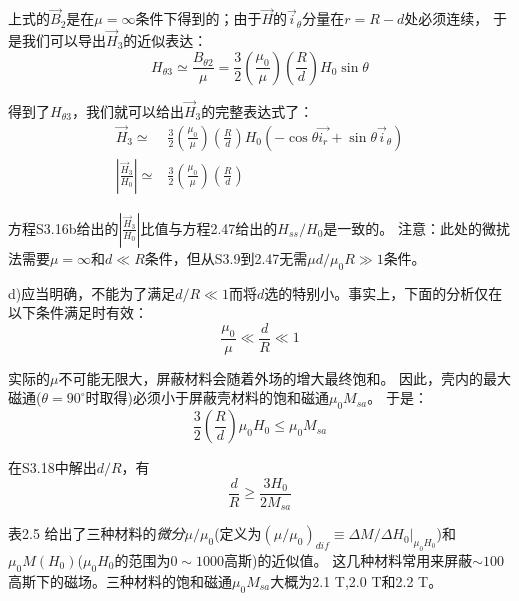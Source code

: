 上式的$\vec{B}_2$是在$\mu=\infty$条件下得到的；由于$\vec{H}$的$\vec{i}_\theta$分量在$r=R-d$处必须连续，
于是我们可以导出$\vec{H}_3$的近似表达：
\begin{equation*}
H_{\theta 3}\simeq \frac{B_{\theta 2}}{\mu}=\frac{3}{2}\left(\frac{\mu_0}{\mu}\right)\left(\frac{R}{d}\right)H_0\sin\theta \tag{S3.15}
\end{equation*}

得到了$H_{\theta 3}$，我们就可以给出$\vec{H}_3$的完整表达式了：
\begin{align}
\vec{H}_3\simeq &\frac{3}{2}\left(\frac{\mu_0}{\mu}\right)\left(\frac{R}{d}\right)H_0(-\cos\theta\vec{i_r}+\sin\theta\vec{i}_\theta) \nonumber\tag{S3.16a}\\
\left|\frac{\vec{H}_3}{H_0}\right|\simeq& \frac{3}{2}\left(\frac{\mu_0}{\mu}\right)\left(\frac{R}{d}\right) \nonumber\tag{S3.16b}
\end{align}

方程S3.16b给出的$\left|\frac{\vec{H}_3}{H_0}\right|$比值与方程2.47给出的$H_{ss}/H_0$是一致的。
注意：此处的微扰法需要$\mu=\infty$和$d\ll R$条件，但从S3.9到2.47无需$\mu d/\mu_0 R \gg 1$条件。

d)应当明确，不能为了满足$d/R \ll 1$而将$d$选的特别小。事实上，下面的分析仅在以下条件满足时有效：
\begin{equation*}
\frac{\mu_0}{\mu} \ll \frac{d}{R} \ll 1 \tag{S3.17}
\end{equation*}

实际的$\mu$不可能无限大，屏蔽材料会随着外场的增大最终饱和。
因此，壳内的最大磁通($\theta=90^\circ$时取得)必须小于屏蔽壳材料的饱和磁通$\mu_0 M_{sa}$。
于是：
\begin{equation*}
\frac{3}{2}\left(\frac{R}{d}\right)\mu_0 H_0 \le \mu_0 M_{sa}  \tag{S3.18}
\end{equation*}

在S3.18中解出$d/R$，有
\begin{equation*}
\frac{d}{R}\ge \frac{3H_0}{2M_{sa}}  \tag{2.48}
\end{equation*}

表2.5 给出了三种材料的\textit{微分}$\mu/\mu_0$(定义为$(\mu/\mu_0)_{dif}\equiv \Delta M/ \Delta H_0 |_{\mu_0 H_0}$)和$\mu_0M(H_0)$($\mu_0 H_0$的范围为$0\sim 1000$高斯)的近似值。
这几种材料常用来屏蔽$\sim 100$高斯下的磁场。三种材料的饱和磁通$\mu_0 M_{sa}$大概为2.1 T,2.0 T和2.2 T。

